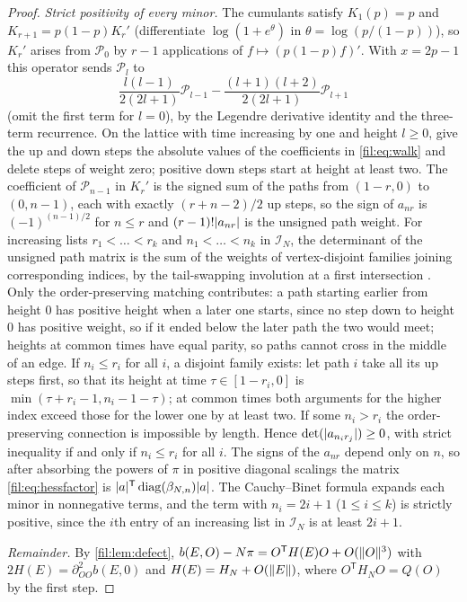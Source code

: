 \begin{proof}
\emph{Strict positivity of every minor.} The cumulants satisfy $K_1(p)=p$ and $K_{r+1}=p(1-p)K_r'$ (differentiate
$\log(1+e^\theta)$ in $\theta=\log(p/(1-p))$), so $K_r'$ arises from $\mathcal P_0$ by $r-1$ applications of
$f\mapsto(p(1-p)f)'$. With $x=2p-1$ this operator sends $\mathcal P_l$ to
\begin{equation}\label{fil:eq:walk}
 \frac{l(l-1)}{2(2l+1)}\mathcal P_{l-1}-\frac{(l+1)(l+2)}{2(2l+1)}\mathcal P_{l+1}
\end{equation}
(omit the first term for $l=0$), by the Legendre derivative identity and the three-term recurrence. On the
lattice with time increasing by one and height $l\ge0$, give the up and down steps the absolute values of the
coefficients in \eqref{fil:eq:walk} and delete steps of weight zero; positive down steps start at height at least
two. The coefficient of $\mathcal P_{n-1}$ in $K_r'$ is the signed sum of the paths from $(1-r,0)$ to $(0,n-1)$, each
with exactly $(r+n-2)/2$ up steps, so the sign of $a_{nr}$ is $(-1)^{(n-1)/2}$ for $n\le r$ and $(r-1)!\lvert a_{nr}\rvert$ is the
unsigned path weight. For increasing lists $r_1<\dots<r_k$ and $n_1<\dots<n_k$ in $\mathcal I_N$, the determinant of
the unsigned path matrix is the sum of the weights of vertex-disjoint families joining corresponding indices,
by the tail-swapping involution at a first intersection \cite{GesselViennot1985Binomial}. Only the order-preserving
matching contributes: a path starting earlier from height $0$ has positive height when a later one starts, since
no step down to height $0$ has positive weight, so if it ended below the later path the two would meet; heights
at common times have equal parity, so paths cannot cross in the middle of an edge. If $n_i\le r_i$ for all $i$, a
disjoint family exists: let path $i$ take all its up steps first, so that its height at time $\tau\in[1-r_i,0]$
is $\min(\tau+r_i-1,n_i-1-\tau)$; at common times both arguments for the higher index exceed those for the lower
one by at least two. If some $n_i>r_i$ the order-preserving connection is impossible by length. Hence
$\det(\lvert a_{n_ir_j}\rvert)\ge0$, with strict inequality if and only if $n_i\le r_i$ for all $i$. The signs of the
$a_{nr}$ depend only on $n$, so after absorbing the powers of $\pi$ in positive diagonal scalings the matrix
\eqref{fil:eq:hessfactor} is $\lvert a\rvert^{\mathsf T}\operatorname{diag}(\beta_{N,n})\lvert a\rvert$. The Cauchy--Binet formula expands
each minor in nonnegative terms, and the term with $n_i=2i+1$ ($1\le i\le k$) is strictly positive, since the
$i$th entry of an increasing list in $\mathcal I_N$ is at least $2i+1$.

\emph{Remainder.} By \cref{fil:lem:defect}, $b(E,O)-N\pi=O^{\mathsf T}H(E)O+O(\lVert O\rVert^3)$ with $2H(E)=\partial^2_{OO}b(E,0)$
and $H(E)=H_N+O(\lVert E\rVert)$, where $O^{\mathsf T}H_NO=Q(O)$ by the first step.
\end{proof}

